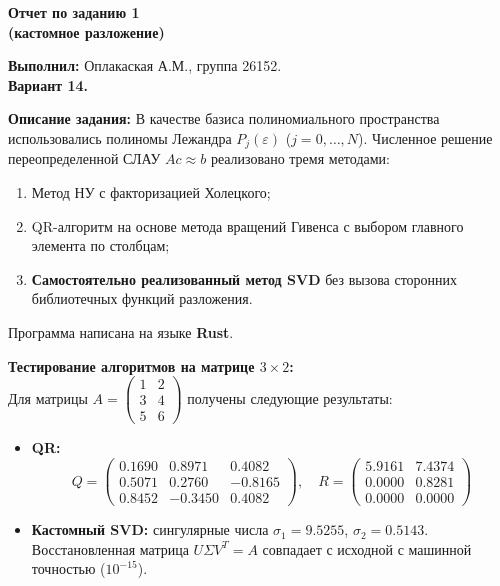 \documentclass[a4paper,12pt]{article}
\begin{document}
	
	\begin{center}
		\textbf{\Large Отчет по заданию 1}\\
		\textbf{\large (кастомное разложение)}
	\end{center}
	
	\vspace{0.3em}
	\noindent \textbf{Выполнил:} Оплакаская А.М., группа 26152. \\
	\textbf{Вариант 14.}
	
	\vspace{0.7em}
	\noindent \textbf{Описание задания:} В качестве базиса полиномиального пространства использовались полиномы Лежандра $P_j(\varepsilon)$ ($j = 0, \dots, N$). Численное решение переопределенной СЛАУ $A c \approx b$ реализовано тремя методами:
	\begin{enumerate}
		\item Метод НУ с факторизацией Холецкого;
		\item QR-алгоритм на основе метода вращений Гивенса с выбором главного элемента по столбцам;
		\item \textbf{Самостоятельно реализованный метод SVD} без вызова сторонних библиотечных функций разложения.
	\end{enumerate}
	Программа написана на языке \textbf{Rust}.
	
	\vspace{0.7em}
	\noindent \textbf{Тестирование алгоритмов на матрице $3 \times 2$:} \\
	Для матрицы $A = \begin{pmatrix} 1 & 2 \\ 3 & 4 \\ 5 & 6 \end{pmatrix}$ получены следующие результаты:
	\begin{itemize}
		\item \textbf{QR:}
		\[
		Q = \begin{pmatrix} 
			0.1690 & 0.8971 & 0.4082 \\ 
			0.5071 & 0.2760 & -0.8165 \\ 
			0.8452 & -0.3450 & 0.4082 
		\end{pmatrix}, \quad
		R = \begin{pmatrix} 
			5.9161 & 7.4374 \\ 
			0.0000 & 0.8281 \\ 
			0.0000 & 0.0000 
		\end{pmatrix}
		\]
		\item \textbf{Кастомный SVD:} сингулярные числа $\sigma_1 = 9.5255$, $\sigma_2 = 0.5143$. Восстановленная матрица $U \Sigma V^T = A$ совпадает с исходной с машинной точностью ($10^{-15}$).
	\end{itemize}
	
\end{document}
